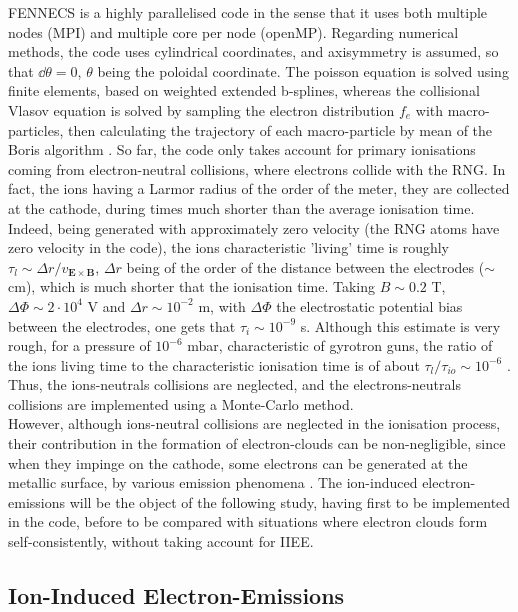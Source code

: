 \noindent FENNECS is a highly parallelised code in the sense that it uses both multiple nodes (MPI) and multiple core per node (openMP). Regarding numerical methods, the code uses cylindrical coordinates, and axisymmetry is assumed, so that $\dd \theta = 0$, $\theta$ being the poloidal coordinate. The poisson equation is solved using finite elements, based on weighted extended b-splines, whereas the collisional Vlasov equation is solved by sampling the electron distribution $f_e$ with macro-particles, then calculating the trajectory of each macro-particle by mean of the Boris algorithm \cite{lebars_et_al, BorisAlg}. So far, the code only takes account for primary ionisations coming from electron-neutral collisions, where electrons collide with the RNG. In fact, the ions having a Larmor radius of the order of the meter, they are collected at the cathode, during times much shorter than the average ionisation time. Indeed, being generated with approximately zero velocity (the RNG atoms have zero velocity in the code), the ions characteristic 'living' time is roughly $\tau_l \sim \Delta r/ v_{\mathbf{E}\times \mathbf{B}}$, $\Delta r$ being of the order of the distance between the electrodes ($\sim$cm), which is much shorter that the ionisation time. Taking $B\sim0.2$ T, $\Delta\Phi \sim 2\cdot 10^4$ V and $\Delta r \sim 10^{-2}$ m, with $\Delta \Phi$ the electrostatic potential bias between the electrodes, one gets that $\tau_i \sim 10^{-9}$ s. Although this estimate is very rough, for a pressure of $10^{-6}$ mbar, characteristic of gyrotron guns, the ratio of the ions living time to the characteristic ionisation time is of about $\tau_l/\tau_{io}\sim 10^{-6}$ \cite{lebars_et_al}. Thus, the ions-neutrals collisions are neglected, and the electrons-neutrals collisions are implemented using a Monte-Carlo method.\\

\noindent However, although ions-neutral collisions are neglected in the ionisation process, their contribution in the formation of electron-clouds can be non-negligible, since when they impinge on the cathode, some electrons can be generated at the metallic surface, by various emission phenomena \cite{baragiola}. The ion-induced electron-emissions will be the object of the following study, having first to be implemented in the code, before to be compared with situations where electron clouds form self-consistently, without taking account for IIEE.
    
\subsection{Ion-Induced Electron-Emissions}\label{IIEE_section}

